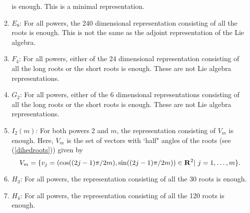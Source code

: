 \documentclass[a4paper,12pt]{article}
\begin{document}
\begin{enumerate}
is enough. This is a minimal representation.
\item
\(E_8\):
For all powers, the 240  dimensional representation consisting
of all the roots is enough.  This is not the same as the adjoint
representation of the Lie algebra.
\item
\(F_4\):
For all powers, either of the 24  dimensional representation consisting
of all the long roots or the short roots is enough. These are not Lie
algebra representations.
\item
\(G_2\):
For all powers, either of the 6  dimensional representations consisting
of all the long roots or the short roots is enough. These are not Lie
algebra representations.
\item
\(I_2(m)\): For both powers 2 and \(m\),
the representation consisting of \(V_m\)
is enough. Here, \(V_m\) is the set of vectors with `half" angles
of the roots (see (\ref{dihedroots}))
given by
\begin{equation}
   V_m=\{v_j=(\cos((2j-1)\pi/2m),\sin((2j-1)\pi/2m))\in{\bf R}^2|\
   j=1,\ldots, m\}.
   \label{vmpara}
\end{equation}
\item
\(H_3\): For all powers, the representation consisting of all the 30 roots
is enough.
\item
\(H_4\): For all powers, the representation consisting of all the 120 roots
is enough.
\end{enumerate}
\end{document}
